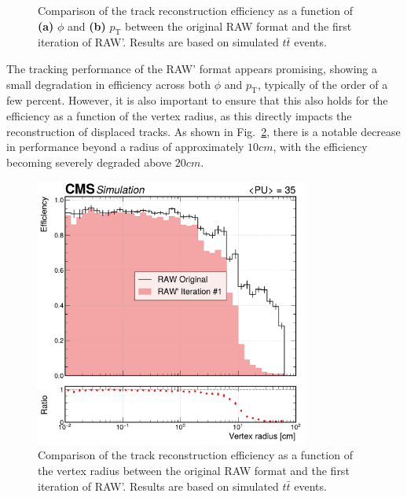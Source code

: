 \begin{figure}[h]
\begin{subfigure}[b]{0.49\textwidth}
            \caption{}
        \end{subfigure}
    \caption[Comparison of the track reconstruction efficiency as a function of $\phi$ and $p_\mathrm{T}$ between the original RAW format and the first iteration of RAW'.]{Comparison of the track reconstruction efficiency as a function of \textbf{(a)} $\phi$ and \textbf{(b)} $p_\mathrm{T}$ between the original RAW format and the first iteration of RAW'. Results are based on simulated $t\bar{t}$ events.} 
    \label{Figure:Chapter5_TrackingPerformance_1}
\end{figure}

The tracking performance of the RAW' format appears promising, showing a small degradation in efficiency across both $\phi$ and $p_\mathrm{T}$, typically of the order of a few percent. However, it is also important to ensure that this also holds for the efficiency as a function of the vertex radius, as this directly impacts the reconstruction of displaced tracks. As shown in Fig.~\ref{Figure:Chapter5_TrackingPerformance_vertexPos_1}, there is a notable decrease in performance beyond a radius of approximately $10\unit{cm}$, with the efficiency becoming severely degraded above $20\unit{cm}$. 

\begin{figure}[h]
\centering
\includegraphics[width=0.8\textwidth]{Figures/Chapter5/efficiency_comparison_1_vertpos.pdf}
\caption[Comparison of the track reconstruction efficiency as a function of the vertex radius between the original RAW format and the first iteration of RAW'.]{Comparison of the track reconstruction efficiency as a function of the vertex radius between the original RAW format and the first iteration of RAW'. Results are based on simulated $t\bar{t}$ events.} 
\label{Figure:Chapter5_TrackingPerformance_vertexPos_1}
\end{figure}

